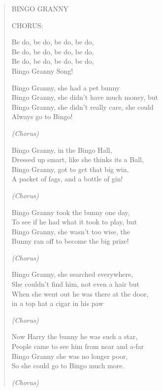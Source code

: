 \begin{verse}
\begin{centering}
\note BINGO GRANNY \enote
\vspace{3pt}

CHORUS:

Be do, be do, be do, be do, \\
Be do, be do, be do, be do, \\
Be do, be do, be do, be do, \\
Bingo Granny Song!

Bingo    Granny,   she   had     a    pet    bunny  \\
Bingo    Granny,   she   didn't have   much    money,   but \\
Bingo    Granny,   she   didn't  really     care,       she could \\
Always go to  Bingo! 

\emph{(Chorus)}

Bingo    Granny,     in      the Bingo      Hall, \\
Dressed up smart, like   she  thinks   its    a      Ball, \\
Bingo    Granny,    got    to    get        that  big   win, \\
A  packet of fags,  and   a     bottle of gin!


\emph{(Chorus)}

Bingo Granny took the bunny one day, \\
To see if he had what it took to play, but \\
Bingo Granny, she wasn't too wise, the \\
Bunny ran off to become the big prize!

\emph{(Chorus)}

Bingo Granny, she searched everywhere, \\
She couldn't find him, not even a hair but \\
When she went out he was there at the door, \\
in a top hat a cigar in his paw

\emph{(Chorus)}

Now Harry the bunny he was such a star, \\
People came to see him from near and a-far \\
Bingo Granny she was no longer poor, \\
So she could go to Bingo much more.

\emph{(Chorus)}

\end{centering}
\end{verse}


